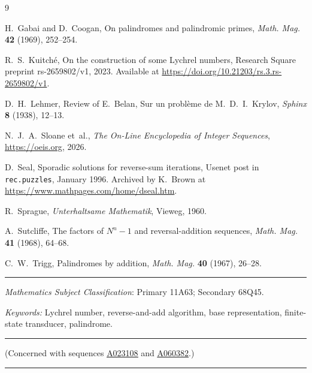 \documentclass[12pt,reqno]{article}
\newcommand{\seqnum}[1]{\href{https://oeis.org/#1}{\rm \underline{#1}}}
\begin{document}
\begin{thebibliography}{9}

H.~Gabai and D.~Coogan, On palindromes and palindromic primes,
{\em Math. Mag.} {\bf 42} (1969), 252--254.

R.~S.~Kuitch\'e, On the construction of some {L}ychrel numbers,
Research Square preprint rs-2659802/v1, 2023. Available at
\url{https://doi.org/10.21203/rs.3.rs-2659802/v1}.

D.~H.~Lehmer, Review of {E}.~{B}elan, {S}ur un probl\`eme de {M}.~{D}.~{I}.~{K}rylov,
{\em Sphinx} {\bf 8} (1938), 12--13.

N.~J.~A.~Sloane et~al., {\em The On-Line Encyclopedia of Integer Sequences},
\url{https://oeis.org}, 2026.

D.~Seal, Sporadic solutions for reverse-sum iterations, Usenet post in
{\tt rec.puzzles}, January 1996. Archived by K.~Brown at
\url{https://www.mathpages.com/home/dseal.htm}.

R.~Sprague, {\em Unterhaltsame Mathematik}, Vieweg, 1960.

A.~Sutcliffe, The factors of $N^n - 1$ and reversal-addition sequences,
{\em Math. Mag.} {\bf 41} (1968), 64--68.

C.~W.~Trigg, Palindromes by addition,
{\em Math. Mag.} {\bf 40} (1967), 26--28.

\end{thebibliography}

\bigskip
\hrule
\bigskip

 {\it Mathematics Subject Classification}:
Primary 11A63; Secondary 68Q45.

\noindent \emph{Keywords:} Lychrel number, reverse-and-add algorithm, base representation, finite-state transducer, palindrome.

\bigskip
\hrule
\bigskip

\noindent (Concerned with sequences
\seqnum{A023108} and
\seqnum{A060382}.)

\bigskip
\hrule
\bigskip
\end{document}
